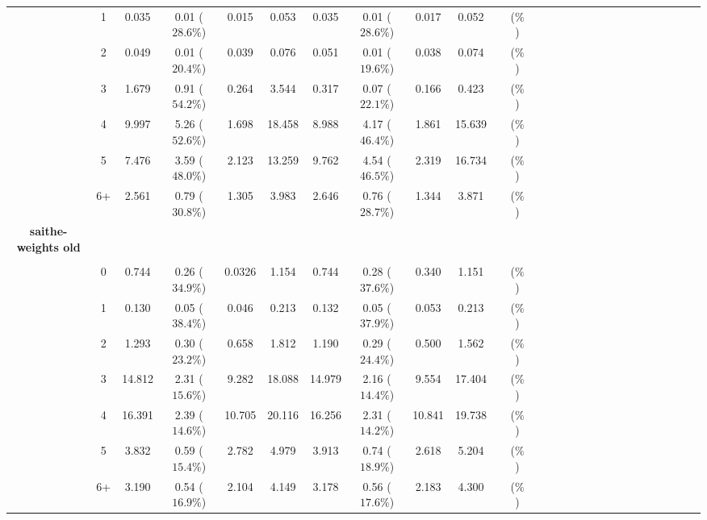 \documentclass[a4paper 12pt]{article}
\numberwithin{equation}{section}
\begin{document}
\begin{tiny}
\begin{table}[h!]
\begin{tabular}{ccccccccccccccccccccccccccc}
\raisebox{1.5ex}{2018 Q1} & 1& 0.035 &0.01 ($28.6 \%$) & 0.015 & 0.053  & 0.035 &0.01 ($28.6 \%$) &0.017 &0.052 &  &  ($ \%$) \\[1ex]
& 2  & 0.049   & 0.01 ($20.4 \%$) &0.039 &0.076  &0.051  &0.01   ($19.6 \%$) &0.038 &0.074  & &  ($ \%$) \\[1ex]
& 3  & 1.679   & 0.91 ($54.2 \%$) &0.264 &3.544  &0.317  &0.07   ($22.1 \%$) &0.166 &0.423  & &  ($ \%$) \\[1ex]
& 4  & 9.997   &5.26 ($52.6 \%$)  &1.698 &18.458 &8.988  &4.17  ($46.4 \%$)  &1.861 &15.639 & &  ($ \%$) \\[1ex]
& 5  & 7.476   &3.59 ($48.0 \%$)  &2.123 &13.259 &9.762  &4.54 ($46.5 \%$)   &2.319 &16.734 & &  ($ \%$) \\[1ex]
& 6+ & 2.561   &0.79 ($30.8 \%$)  &1.305 &3.983  &2.646  &0.76  ($28.7 \%$)  &1.344 &3.871  & &  ($ \%$)\\[0.5ex]


{\bf saithe-weights old} \\[1.0ex]
\cmidrule(lr{0.1em}){1-1}\\[1.0ex]

\raisebox{1.5ex}{2017 Q3} & 0& 0.744 &0.26 ($34.9 \%$) & 0.0326 & 1.154  & 0.744 &0.28 ($37.6 \%$) &0.340 &1.151 &  &  ($ \%$) \\[1ex]
 & 1  & 0.130   & 0.05 ($38.4 \%$) &0.046 &0.213  &0.132  &0.05   ($37.9 \%$) &0.053 &0.213 & &  ($ \%$) \\[1ex]
& 2  & 1.293  & 0.30 ($23.2 \%$) &0.658 & 1.812 &1.190  &0.29   ($24.4 \%$) &0.500 &1.562 & &  ($ \%$) \\[1ex]
& 3  & 14.812 & 2.31 ($15.6 \%$) &9.282 &18.088 &14.979 &2.16  ($14.4 \%$) &9.554 &17.404 & &  ($ \%$) \\[1ex]
& 4  & 16.391 &2.39 ($14.6 \%$) &10.705 &20.116 &16.256 &2.31 ($14.2 \%$) &10.841 &19.738 & &  ($ \%$) \\[1ex]
& 5 & 3.832  &0.59  ($15.4 \%$) &2.782 & 4.979 &3.913  &0.74  ($18.9 \%$)  &2.618 &5.204 & &  ($ \%$)\\[1ex]
& 6+ & 3.190  &0.54  ($16.9 \%$) &2.104 & 4.149 &3.178  &0.56  ($17.6 \%$)  &2.183 &4.300 & &  ($ \%$)\\[3.5ex]


\end{tabular}
\end{table}
\end{tiny}
\end{document}
